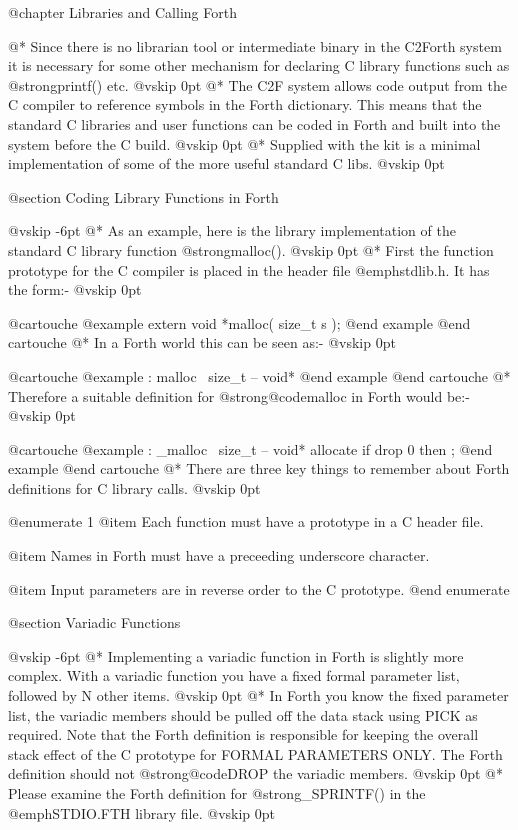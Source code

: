 
@chapter Libraries and Calling Forth

@*
Since there is no librarian tool or intermediate binary in the
C2Forth system it is necessary for some other mechanism for
declaring C library functions such as @strong{printf()} etc.
@vskip 0pt
@*
The C2F system allows code output from the C compiler to
reference symbols in the Forth dictionary. This means that the
standard C libraries and user functions can be coded in Forth
and built into the system before the C build.
@vskip 0pt
@*
Supplied with the kit is a minimal implementation of some of the
more useful standard C libs.
@vskip 0pt

@section Coding Library Functions in Forth


@vskip -6pt
@*
As an example, here is the library implementation of the standard
C library function @strong{malloc()}.
@vskip 0pt
@*
First the function prototype for the C compiler is placed in the
header file @emph{stdlib.h}. It has the form:-
@vskip 0pt

@cartouche
@example
   extern void *malloc( size_t s ); @end example
@end cartouche
@*
In a Forth world this can be seen as:-
@vskip 0pt

@cartouche
@example
   : malloc        \ size_t -- void* @end example
@end cartouche
@*
Therefore a suitable definition for @strong{@code{malloc}} in Forth
would be:-
@vskip 0pt

@cartouche
@example
   : _malloc       \ size_t -- void*
     allocate
     if drop 0 then
   ; @end example
@end cartouche
@*
There are three key things to remember about Forth definitions for
C library calls.
@vskip 0pt

@enumerate 1 
@item Each function must have a prototype in a C header file.

@item Names in Forth must have a preceeding underscore character.

@item Input parameters are in reverse order to the C prototype.
@end enumerate

@section Variadic Functions


@vskip -6pt
@*
Implementing a variadic function in Forth is slightly more
complex. With a variadic function you have a fixed formal parameter
list, followed by N other items.
@vskip 0pt
@*
In Forth you know the fixed parameter list, the variadic members
should be pulled off the data stack using PICK as required. Note
that the Forth definition is responsible for keeping the overall
stack effect of the C prototype for FORMAL PARAMETERS ONLY. The
Forth definition should not @strong{@code{DROP}} the variadic members.
@vskip 0pt
@*
Please examine the Forth definition for @strong{_SPRINTF()} in
the @emph{STDIO.FTH} library file.
@vskip 0pt
